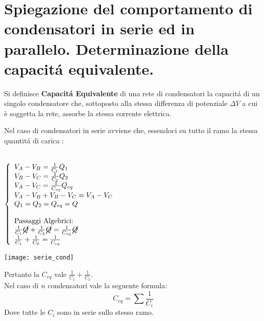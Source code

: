 \section{Spiegazione del comportamento di condensatori in
	serie ed in parallelo. Determinazione della capacit\'a
	equivalente.}

Si definisce \textbf{Capacit\'a Equivalente} di una rete di condensatori la capacit\'a di un singolo condensatore che, sottoposto alla stessa differenza di potenziale $\Delta V$ a cui \`e soggetta la rete, assorbe la stessa corrente elettrica.

Nel caso di condensatori in serie avviene che, essendoci su tutto il ramo la stessa quantit\'a di carica :\\
\\
\noindent\begin{minipage}{0.3\textwidth}
$
\left\{
\begin{array}{llr}
	V_A - V_B = \frac{1}{C_1}Q_1 \\
	V_B - V_C = \frac{1}{C_2}Q_2 \\	
	V_A - V_C = \frac{1}{C_{eq}}Q_{eq} \\
	V_A - V_B + V_B - V_C = V_A - V_C  \\
	Q_1 = Q_2 = Q_{eq} = Q \\
	\\
	\textnormal{Passaggi Algebrici:}\\
	\frac{1}{C_1}\cancel{Q} + \frac{1}{C_2}\cancel{Q} = \frac{1}{C_{eq}}\cancel{Q} \\
	\frac{1}{C_1} + \frac{1}{C_2} = \frac{1}{C_{eq}}
\end{array}
\right.
$
\end{minipage}
\hfill%
\begin{minipage}{0.6\textwidth}\raggedleft
	\texttt{[image: serie\_cond]}
\end{minipage}
Pertanto la $C_{eq}$ vale $\frac{1}{C_1} + \frac{1}{C_2}$.\\
Nel caso di $n$ condensatori vale la seguente formula:
\begin{equation}
    C_{eq} = \sum{\frac{1}{C_i}}
\end{equation}
Dove tutte le $C_i$ sono in serie sullo stesso ramo.\\
